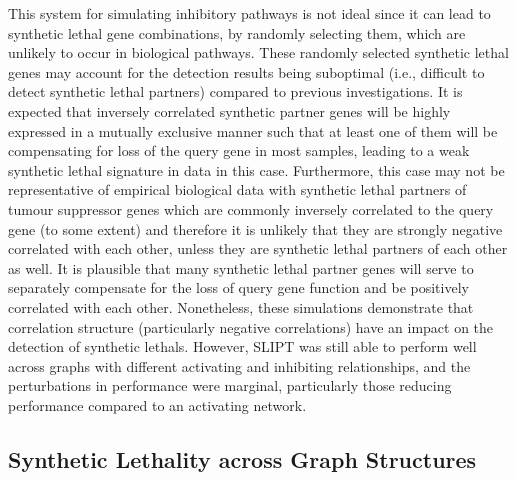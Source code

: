 This system for simulating inhibitory pathways is not ideal since it can lead to \gls{synthetic lethal} gene combinations, by randomly selecting them, which are unlikely to occur in biological pathways. These randomly selected \gls{synthetic lethal} genes may account for the detection results being suboptimal (i.e., difficult to detect \gls{synthetic lethal} partners) compared to previous investigations. It is expected that inversely correlated synthetic partner genes will be highly expressed in a mutually exclusive manner such that at least one of them will be compensating for loss of the query gene in most samples, leading to a weak \gls{synthetic lethal} signature in  data in this case. Furthermore, this case may not be representative of empirical biological data with \gls{synthetic lethal} partners of \gls{tumour suppressor} genes which are commonly inversely correlated to the query gene (to some extent) and therefore it is unlikely that they are strongly negative correlated with each other, unless they are \gls{synthetic lethal} partners of each other as well. It is plausible that many \gls{synthetic lethal} partner genes will serve to separately compensate for the loss of query gene function and be positively correlated with each other. Nonetheless, these simulations demonstrate that correlation structure (particularly negative correlations) have an impact on the detection of \glspl{synthetic lethal}. However, \gls{SLIPT} was still able to perform well across \glspl{graph} with different activating and inhibiting relationships, and the perturbations in performance were marginal, particularly those reducing performance compared to an activating network.  

\FloatBarrier

\subsection{Synthetic Lethality across Graph Structures}
\label{chapt5:graphsim_str}

\FloatBarrier

